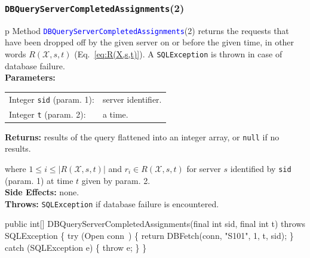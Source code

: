 \documentclass{article}
\def\nwendcode{\endtrivlist \endgroup}      %
\let\nwdocspar=\par
\theoremstyle{definition}                   %
\begin{document}
\subsubsection{{\tt{}\protect{}DBQueryServerCompletedAssignments}(2)}
\begin{tabular}{p{\textwidth}}
\toprule
{}
Method \textcolor{blue}{{\tt{}\protect{}DBQueryServerCompletedAssignments}}(2) returns the
requests that have been dropped off by the given server on or before the given time,
in other words $R(\mathcal{X},s,t)$ (Eq.~\ref{eq:R(X,s,t)}).
A {\tt{}SQLException} is thrown in case of database failure.\\
\midrule
\textbf{Parameters:} \\
\begin{tabular}{lp{116mm}}
Integer {\tt{}sid} (param. 1):&server identifier.\\
Integer {\tt{}t} (param. 2):&a time.\\
\end{tabular}
\textbf{Returns:} results of the query flattened into an integer array,
or {\tt{}null} if no results.


where $1\leq i\leq |R(\mathcal{X},s,t)|$ and
$r_i\in R(\mathcal{X},s,t)$ for server $s$ identified by {\tt{}sid} (param. 1)
at time $t$ given by param. 2.\\
\textbf{Side Effects:} none.\\
\textbf{Throws:} {\tt{}SQLException} if database failure is encountered.\\
\bottomrule
\end{tabular}
\nwenddocs{}\endmoddef{}
public int[] DBQueryServerCompletedAssignments(final int sid, final int t)
throws SQLException \{
  try (\LA{}Open \code{}conn\edoc{}~{\nwtagstyle{}}\RA{}) \{
    return DBFetch(conn, "S101", 1, t, sid);
  \} catch (SQLException e) \{
    throw e;
  \}
\}
\eatline
{}\nwendcode{}\nwdocspar
\end{document}

